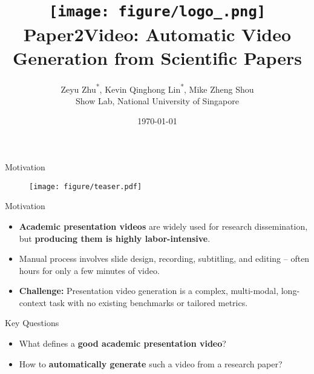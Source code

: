 \documentclass{beamer}
\title[Paper2Video]{\texttt{[image: figure/logo\_.png]} Paper2Video: Automatic Video Generation from Scientific Papers}
\author[Zeyu Zhu, Kevin Q. Lin, Mike Z. Shou]{
  Zeyu Zhu\textsuperscript{*}, Kevin Qinghong Lin\textsuperscript{*}, Mike Zheng Shou\Letter \\
  {\small Show Lab, National University of Singapore}
}
\date{\today}
\newcommand{\alertterm}[1]{\alert{\textbf{#1}}}
\begin{document}
\begin{frame}
  \titlepage
\end{frame}

\begin{frame}{Motivation}
  \begin{figure}
      \centering
      \texttt{[image: figure/teaser.pdf]}
      \vspace{-1\baselineskip}
      \label{fig:placeholder}
  \end{figure}
  \vspace{-1\baselineskip}
 \begin{block}{\small Motivation}
 \footnotesize
  \begin{itemize}
    \item \textbf{Academic presentation videos} are widely used for research dissemination, but \alertterm{producing them is highly labor-intensive}.
    \item Manual process involves slide design, recording, subtitling, and editing -- often hours for only a few minutes of video.
    \item \alertterm{Challenge:} Presentation video generation is a complex, multi-modal, long-context task with no existing benchmarks or tailored metrics.
  \end{itemize}
  \end{block}
  \begin{block}{\small Key Questions}
    \footnotesize
    \begin{itemize}
      \item What defines a \alertterm{good academic presentation video}?
      \item How to \alertterm{automatically generate} such a video from a research paper?
    \end{itemize}
  \end{block}
\end{frame}
\end{document}
